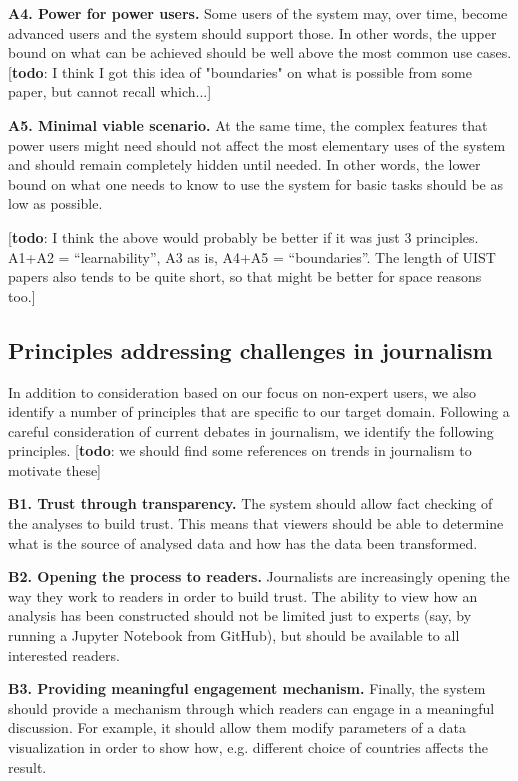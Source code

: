 \documentclass{sigchi}
\newcommand{\todo}[1]{\textcolor{todoColor}{[\textbf{todo}: #1]}}
\begin{document}
\textbf{A4. Power for power users.} Some users of the system may, over time, become advanced users
and the system should support those. In other words, the upper bound on what can be achieved
should be well above the most common use cases. \todo{I think I got this idea of "boundaries" on what
is possible from some paper, but cannot recall which...}

\textbf{A5. Minimal viable scenario.} At the same time, the complex features that power users might
need should not affect the most elementary uses of the system and should remain completely hidden
until needed. In other words, the lower bound on what one needs to know to use the system for basic
tasks should be as low as possible.

\todo{I think the above would probably be better if it was just 3 principles. A1+A2 = ``learnability'',
A3 as is, A4+A5 = ``boundaries''. The length of UIST papers also tends to be quite short, so that
might be better for space reasons too.}

\subsection{Principles addressing challenges in journalism}
In addition to consideration based on our focus on non-expert users, we also identify a number
of principles that are specific to our target domain. Following a careful consideration of
current debates in journalism, we identify the following principles. \todo{we should find some
references on trends in journalism to motivate these}

\textbf{B1. Trust through transparency.} The system should allow fact checking of the analyses to
build trust. This means that viewers should be able to determine what is the source of analysed
data and how has the data been transformed.

\textbf{B2. Opening the process to readers.} Journalists are increasingly opening the way they work
to readers in order to build trust. The ability to view how an analysis has been constructed should
not be limited just to experts (say, by running a Jupyter Notebook from GitHub), but should be
available to all interested readers.

\textbf{B3. Providing meaningful engagement mechanism.} Finally, the system should provide a
mechanism through which readers can engage in a meaningful discussion. For example, it should allow
them modify parameters of a data visualization in order to show how, e.g. different choice of
countries affects the result. 
\end{document}
